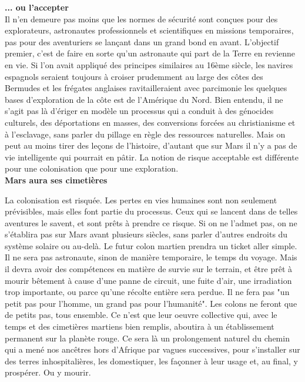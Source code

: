 \documentclass[8pt]{article}
\begin{document}
\textbf{... ou l'accepter}\\

Il n'en demeure pas moins que les normes de sécurité sont conçues pour des explorateurs, astronautes professionnels et scientifiques en missions temporaires, pas pour des aventuriers se lançant dans un grand bond en avant. L'objectif premier, c'est de faire en sorte qu'un astronaute qui part de la Terre en revienne en vie. Si l'on avait appliqué des principes similaires au 16ème siècle, les navires espagnols seraient toujours à croiser prudemment au large des côtes des Bermudes et les frégates anglaises ravitailleraient avec parcimonie les quelques bases d'exploration de la côte est de l'Amérique du Nord. 
Bien entendu, il ne s'agit pas là d'ériger en modèle un processus qui a conduit à des génocides culturels, des déportations en masses, des conversions forcées au christianisme et à l'esclavage, sans parler du pillage en règle des ressources naturelles. Mais on peut au moins tirer des leçons de l'histoire, d'autant que sur Mars il n'y a pas de vie intelligente qui pourrait en pâtir. La notion de risque acceptable est différente pour une colonisation que pour une exploration.\\

\textbf{Mars aura ses cimetières}

La colonisation est risquée. Les pertes en vies humaines sont non seulement prévisibles, mais elles font partie du processus. Ceux qui se lancent dans de telles aventures le savent, et sont prêts à prendre ce risque. Si on ne l'admet pas, on ne s'établira pas sur Mars avant plusieurs siècles, sans parler d'autres endroits du système solaire ou au-delà. Le futur colon martien prendra un ticket aller simple. Il ne sera pas astronaute, sinon de manière temporaire, le temps du voyage. Mais il devra avoir des compétences en matière de survie sur le terrain, et être prêt à mourir bêtement à cause d'une panne de circuit, une fuite d'air, une irradiation trop importante, ou parce qu'une récolte entière sera perdue. Il ne fera pas "un petit pas pour l'homme, un grand pas pour l'humanité". Les colons ne feront que de petits pas, tous ensemble. Ce n'est que leur oeuvre collective qui, avec le temps et des cimetières martiens bien remplis, aboutira à un établissement permanent sur la planète rouge. Ce sera là un prolongement naturel du chemin qui a mené nos ancêtres hors d'Afrique par vagues successives, pour s'installer sur des terres inhospitalières, les domestiquer, les façonner à leur usage et, au final, y prospérer. Ou y mourir.\\
\end{document}
